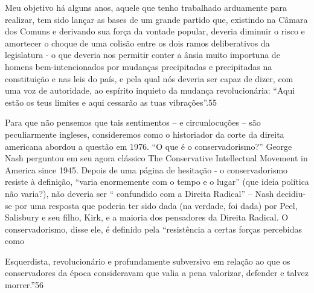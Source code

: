  \par 
Meu objetivo há alguns anos, aquele que tenho trabalhado arduamente para realizar, tem sido lançar as bases de um grande partido que, existindo na Câmara dos Comuns e derivando sua força da vontade popular, deveria diminuir o risco e amortecer o choque de uma colisão entre os dois ramos deliberativos da legislatura - o que deveria nos permitir conter a ânsia muito importuna de homens bem-intencionados por mudanças precipitadas e precipitadas na constituição e nas leis do país, e pela qual nós deveria ser capaz de dizer, com uma voz de autoridade, ao espírito inquieto da mudança revolucionária: “Aqui estão os teus limites e aqui cessarão as tuas vibrações”.{\color{blue}55}
 \par 
Para que não pensemos que tais sentimentos – e circunlocuções – são peculiarmente ingleses, consideremos como o historiador da corte da direita americana abordou a questão em 1976. “O que é o conservadorismo?” George Nash perguntou em seu agora clássico The Conservative Intellectual Movement in America since 1945. Depois de uma página de hesitação - o conservadorismo resiste à definição, “varia enormemente com o tempo e o lugar” (que ideia política não varia?), não deveria ser “ confundido com a Direita Radical” – Nash decidiu-se por uma resposta que poderia ter sido dada (na verdade, foi dada) por Peel, Salisbury e seu filho, Kirk, e a maioria dos pensadores da Direita Radical. O conservadorismo, disse ele, é definido pela “resistência a certas forças percebidas como
 \par 
Esquerdista, revolucionário e profundamente subversivo em relação ao que os conservadores da época consideravam que valia a pena valorizar, defender e talvez morrer.”{\color{blue}56}
 \par 

